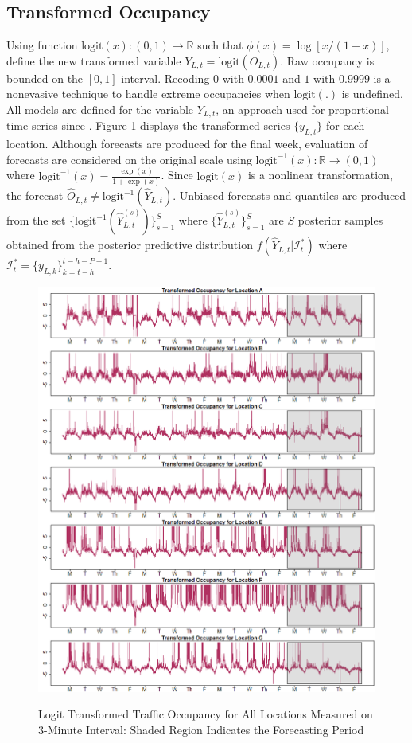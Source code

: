 \subsection{Transformed Occupancy}
Using function $\textrm{logit}(x):(0,1)\to\mathbb{R}$ such that $\phi(x)=\log [x/(1-x)]$, define the new transformed variable $Y_{L,t}=\textrm{logit}(O_{L,t})$. Raw occupancy is bounded on the $[0,1]$ interval. Recoding $0$ with $0.0001$ and $1$ with $0.9999$ is a nonevasive technique to handle extreme occupancies when $\textrm{logit}(.)$ is undefined. All models are defined for the variable $Y_{L,t}$, an approach used for proportional time series since \cite{Wallis1987}. Figure \ref{fig:TransPlotTrafficOcc} displays the transformed series $\{y_{L,t}\}$ for each location. Although forecasts are produced for the final week, evaluation of forecasts are considered on the original scale using $\textrm{logit}^{-1}(x):\mathbb{R}\to(0,1)$ where $\textrm{logit}^{-1}(x)=\frac{\exp(x)}{1+\exp(x)}$. Since $\textrm{logit}(x)$ is a nonlinear transformation, the forecast $\hat{O}_{L,t} \neq  \textrm{logit}^{-1}(\hat{Y}_{L,t})$. Unbiased forecasts and quantiles are produced from the set $\{\textrm{logit}^{-1}(\hat{Y}^{(s)}_{L,t})\}_{s=1}^{S}$ where $\{\hat{Y}^{(s)}_{L,t}\}_{s=1}^{S}$ are $S$ posterior samples obtained from the posterior predictive distribution $f(\hat{Y}_{L,t}|\mathcal{I}^*_t)$ where $\mathcal{I}^*_t=\{y_{L,k}\}_{k=t-h}^{t-h-P+1}$.
\begin{figure}[htbp]
\caption{Logit Transformed Traffic Occupancy for All Locations Measured on 3-Minute Interval: Shaded Region Indicates the Forecasting Period}
\includegraphics[width=\textwidth]{Transplots}
\label{fig:TransPlotTrafficOcc}
\end{figure}


